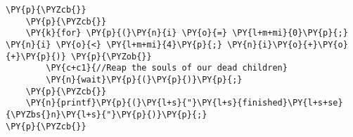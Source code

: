 \begin{Verbatim}[commandchars=\\\{\}]
		\PY{p}{\PYZcb{}}
	\PY{p}{\PYZcb{}}
	\PY{k}{for} \PY{p}{(}\PY{n}{i} \PY{o}{=} \PY{l+m+mi}{0}\PY{p}{;} \PY{n}{i} \PY{o}{<} \PY{l+m+mi}{4}\PY{p}{;} \PY{n}{i}\PY{o}{+}\PY{o}{+}\PY{p}{)} \PY{p}{\PYZob{}}
		\PY{c+c1}{//Reap the souls of our dead children}
		\PY{n}{wait}\PY{p}{(}\PY{p}{)}\PY{p}{;}
	\PY{p}{\PYZcb{}}
	\PY{n}{printf}\PY{p}{(}\PY{l+s}{"}\PY{l+s}{finished}\PY{l+s+se}{\PYZbs{}n}\PY{l+s}{"}\PY{p}{)}\PY{p}{;}
\PY{p}{\PYZcb{}}
\end{Verbatim}
